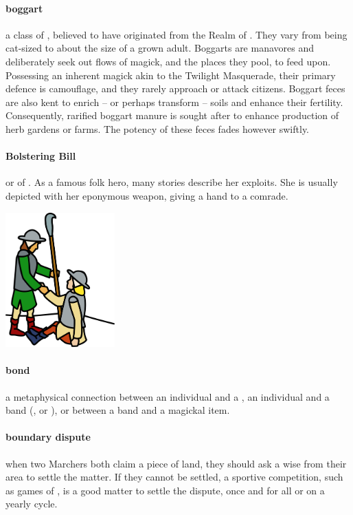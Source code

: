 \paragraph{boggart} a class of , believed to have originated from the Realm of . They vary from being cat-sized to about the size of a grown adult. Boggarts are manavores and deliberately seek out flows of magick, and the places they pool, to feed upon. Possessing an inherent magick akin to the  Twilight Masquerade, their primary defence is camouflage, and they rarely approach or attack citizens. Boggart feces are also kent to enrich – or perhaps transform – soils and enhance their fertility. Consequently, rarified boggart manure is sought after to enhance production of herb gardens or farms. The potency of these feces fades however swiftly. 
\paragraph{Bolstering Bill} or   of . As a famous folk hero, many stories describe her exploits. She is usually depicted with her eponymous weapon, giving a hand to a comrade. \begin{center}\includegraphics[width=4.2cm]{encyclopedia/Wilhelmina} \end{center}
\paragraph{bond} a metaphysical connection between an individual and a , an individual and a band (,  or ), or between a band and a magickal item. 
\paragraph{boundary dispute} when two Marchers both claim a piece of land, they should ask a wise  from their area to settle the matter. If they cannot be settled, a sportive competition, such as games of , is a good matter to settle the dispute, once and for all or on a yearly cycle.
